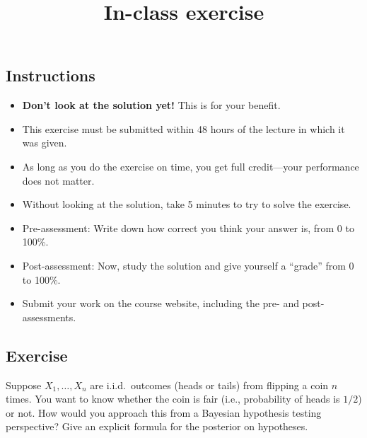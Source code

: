 \documentclass[12pt]{article}
\title{In-class exercise}
\author{}
\date{}
\begin{document}
\maketitle

\subsection*{Instructions}
\begin{itemize}
\item \textbf{Don't look at the solution yet!} This is for your benefit.
\item This exercise must be submitted within 48 hours of the lecture in which it was given. 
\item As long as you do the exercise on time, you get full credit---your performance does not matter.
\item Without looking at the solution, take 5 minutes to try to solve the exercise.
\item Pre-assessment: Write down how correct you think your answer is, from 0 to 100\%.
\item Post-assessment: Now, study the solution and give yourself a ``grade'' from 0 to 100\%.
\item Submit your work on the course website, including the pre- and post- assessments.
\end{itemize}

\subsection*{Exercise}
Suppose $X_1,\ldots,X_n$ are i.i.d.\ outcomes (heads or tails) from flipping a coin $n$ times.
You want to know whether the coin is fair (i.e., probability of heads is $1/2$) or not.
How would you approach this from a Bayesian hypothesis testing perspective?
Give an explicit formula for the posterior on hypotheses.
\end{document}
